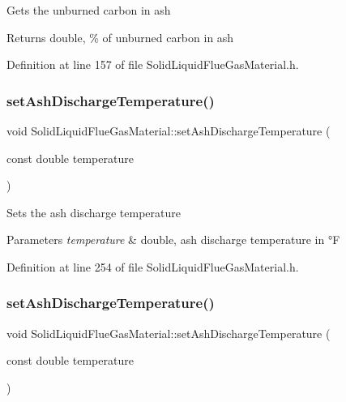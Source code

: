 Gets the unburned carbon in ash \begin{DoxyReturn}{Returns}
double, \% of unburned carbon in ash 
\end{DoxyReturn}


Definition at line 157 of file Solid\+Liquid\+Flue\+Gas\+Material.\+h.

\mbox{\label{class_solid_liquid_flue_gas_material_ad29543a88737c3d051c7d824287bc791}} 
\subsubsection{\texorpdfstring{set\+Ash\+Discharge\+Temperature()}{setAshDischargeTemperature()}\hspace{0.1cm}{\footnotesize\ttfamily [1/3]}}
{\footnotesize\ttfamily void Solid\+Liquid\+Flue\+Gas\+Material\+::set\+Ash\+Discharge\+Temperature (\begin{DoxyParamCaption}\item[{const double}]{temperature }\end{DoxyParamCaption})\hspace{0.3cm}{\ttfamily [inline]}}

Sets the ash discharge temperature 
\begin{DoxyParams}{Parameters}
{\em temperature} & double, ash discharge temperature in °F \\
\hline
\end{DoxyParams}


Definition at line 254 of file Solid\+Liquid\+Flue\+Gas\+Material.\+h.

\mbox{\label{class_solid_liquid_flue_gas_material_ad29543a88737c3d051c7d824287bc791}} 
\subsubsection{\texorpdfstring{set\+Ash\+Discharge\+Temperature()}{setAshDischargeTemperature()}\hspace{0.1cm}{\footnotesize\ttfamily [2/3]}}
{\footnotesize\ttfamily void Solid\+Liquid\+Flue\+Gas\+Material\+::set\+Ash\+Discharge\+Temperature (\begin{DoxyParamCaption}\item[{const double}]{temperature }\end{DoxyParamCaption})\hspace{0.3cm}{\ttfamily [inline]}}

